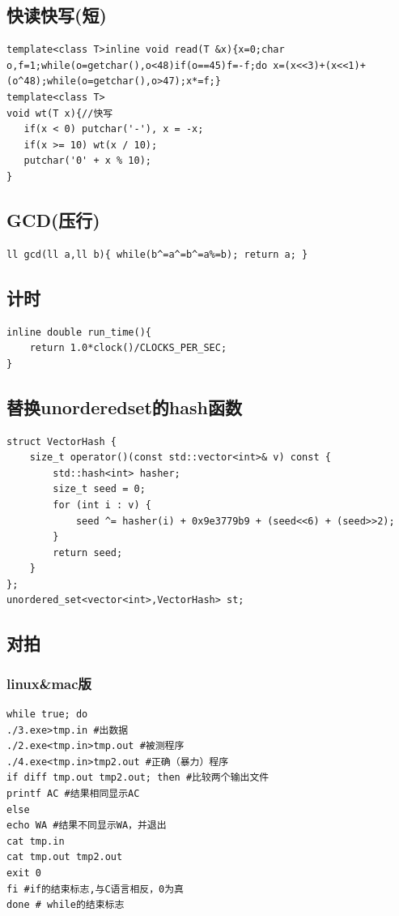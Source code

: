 \documentclass[a4]{ctexart}
\begin{document}
\subsection{快读快写(短)}
\begin{lstlisting}
template<class T>inline void read(T &x){x=0;char o,f=1;while(o=getchar(),o<48)if(o==45)f=-f;do x=(x<<3)+(x<<1)+(o^48);while(o=getchar(),o>47);x*=f;}
template<class T>
void wt(T x){//快写
   if(x < 0) putchar('-'), x = -x;
   if(x >= 10) wt(x / 10);
   putchar('0' + x % 10);
}
\end{lstlisting}

\subsection{GCD(压行)}
\begin{lstlisting}
ll gcd(ll a,ll b){ while(b^=a^=b^=a%=b); return a; }
\end{lstlisting}

\subsection{计时}
\begin{lstlisting}
inline double run_time(){
    return 1.0*clock()/CLOCKS_PER_SEC;
}
\end{lstlisting}


\subsection{替换unorderedset的hash函数}
\begin{lstlisting}
struct VectorHash {
    size_t operator()(const std::vector<int>& v) const {
        std::hash<int> hasher;
        size_t seed = 0;
        for (int i : v) {
            seed ^= hasher(i) + 0x9e3779b9 + (seed<<6) + (seed>>2);
        }
        return seed;
    }
};
unordered_set<vector<int>,VectorHash> st;
\end{lstlisting}
\subsection{对拍}
\subsubsection{linux\&mac版}
\begin{lstlisting}
while true; do
./3.exe>tmp.in #出数据
./2.exe<tmp.in>tmp.out #被测程序
./4.exe<tmp.in>tmp2.out #正确（暴力）程序
if diff tmp.out tmp2.out; then #比较两个输出文件
printf AC #结果相同显示AC
else
echo WA #结果不同显示WA，并退出
cat tmp.in
cat tmp.out tmp2.out
exit 0
fi #if的结束标志,与C语言相反，0为真
done # while的结束标志
\end{lstlisting}
\end{document}

